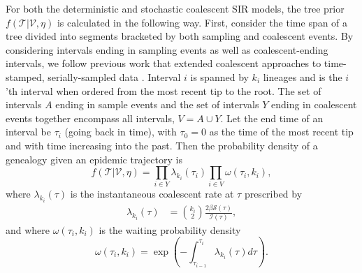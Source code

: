\documentclass[12pt,titlepage]{article}
\newcommand{\St}{\mathcal{S}}
\newcommand{\It}{\mathcal{I}}
\newcommand{\traj}{\mathcal{V}}
\newcommand{\tree}{\mathcal{T}}
\begin{document}


For both the deterministic and stochastic coalescent SIR models, the tree prior $f(\tree|\traj,\eta)$ is calculated in the following way.  First, consider the time span of a tree divided into segments bracketed by both 
sampling and coalescent events. By considering intervals ending in sampling events as well as coalescent-ending intervals, we follow previous work
that extended coalescent approaches to time-stamped, serially-sampled data \citep{RodrigoFelsenstein1999,Drummond:2002}.
 Interval $i$ is spanned by $k_i$ lineages and is the 
$i$'th interval when ordered from the most recent tip to the root. The set of intervals 
$A$ ending in sample events and the set of intervals $Y$ ending in coalescent events 
together encompass all intervals, $V = A \cup Y$. Let the end time of an interval be $\tau_i$ 
(going back in time), with $\tau_0=0$ as the time of the most recent tip and with time increasing 
into the past. Then the probability density of a genealogy given an epidemic trajectory is
\begin{equation}
f(\tree|\traj, \eta) = \prod_{i \in Y} {\lambda}_{k_{i}}(\tau_i) \prod_{i\in V}\omega(\tau_i, 
k_i),
\label{eq:treeGivenTraj}
\end{equation}
where $\lambda_{k_i}(\tau)$ is the instantaneous coalescent rate at $\tau$ prescribed by
\cite{Volz:2012}
\begin{align}
\lambda_{k_i}(\tau) &= \binom{k_i}{2}\frac{2{\beta}{\St}({\tau})}{{\It}({\tau})},
\label{eq:coalrate}
\end{align}
and where $\omega(\tau_i,k_i)$ is the waiting probability density
\begin{equation}
\omega(\tau_i, k_i) = \exp\left({-{\int_{\tau_{i-1}}^{\tau_{i}}{\lambda_{k_i}(\tau)d\tau}}}\right).
\end{equation}
\end{document}

